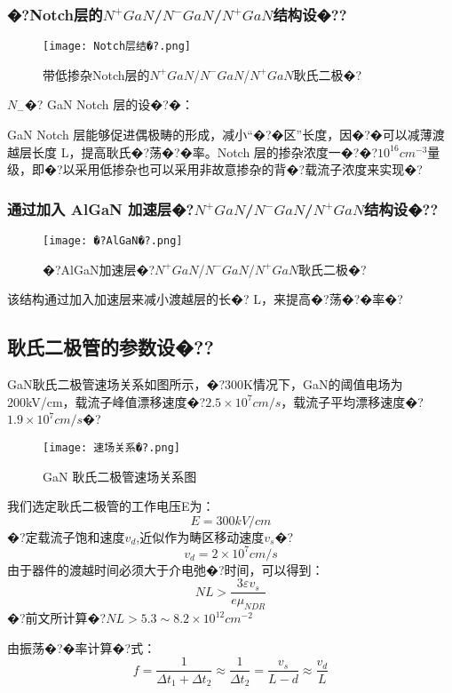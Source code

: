 \documentclass{zjureport}
\begin{document}
\subsubsection{�?Notch层的$N^{+}GaN$/$N^{-}GaN$/$N^{+}GaN$结构设�??}
\begin{figure}[htbp]
	\centering
	\texttt{[image: Notch层结�?.png]}
	\caption{带低掺杂Notch层的$N^{+}GaN$/$N^{-}GaN$/$N^{+}GaN$耿氏二极�?}
\end{figure}
$N_-$�? GaN Notch 层的设�?�：

GaN Notch 层能够促进偶极畴的形成，减小“�?�区”长度，因�?�可以减薄渡越层长度 L，提高耿氏�?荡�?�率。Notch 层的掺杂浓度一�?�?$10^{16}cm^{-3}$量级，即�?以采用低掺杂也可以采用非故意掺杂的背�?载流子浓度来实现�?
\subsubsection{通过加入 AlGaN 加速层�?$N^{+}GaN$/$N^{-}GaN$/$N^{+}GaN$结构设�??}
\begin{figure}[htbp]
	\centering
	\texttt{[image: �?AlGaN�?.png]}
	\caption{�?AlGaN加速层�?$N^{+}GaN$/$N^{-}GaN$/$N^{+}GaN$耿氏二极�?}
\end{figure}
该结构通过加入加速层来减小渡越层的长�? L，来提高�?荡�?�率�?
\subsection{耿氏二极管的参数设�??}
GaN耿氏二极管速场关系如图所示，�?300K情况下，GaN的阈值电场为200kV/cm，载流子峰值漂移速度�?$2.5×10^7cm/s$，载流子平均漂移速度�?$1.9×10^7cm/s$�?
\begin{figure}[htbp]
	\centering
	\texttt{[image: 速场关系�?.png]}
	\caption{GaN 耿氏二极管速场关系图}
\end{figure}

我们选定耿氏二极管的工作电压E为：
\begin{equation}
	E=300kV/cm
\end{equation}
�?定载流子饱和速度$v_d$,近似作为畴区移动速度$v_s$�?
\begin{equation}
		v_d=2×10^7cm/s
\end{equation}
由于器件的渡越时间必须大于介电弛�?时间，可以得到：
\begin{equation}
	NL>\frac{3\varepsilon v_s}{e\mu_{NDR}}
\end{equation}
�?前文所计算�?$NL>5.3\sim8.2×10^{12}cm^{-2}$

由振荡�?�率计算�?式：
\begin{equation}
		f=\frac{1}{\Delta t_1+\Delta t_2}\approx\frac{1}{\Delta t_2}=\frac{v_s}{L-d}\approx\frac{v_d}{L}
\end{equation}
\end{document}
